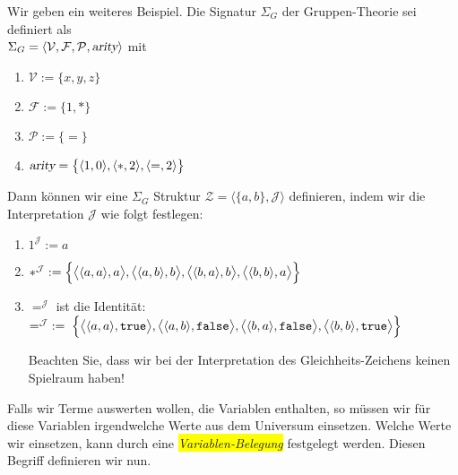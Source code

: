 \example
 Wir geben ein weiteres  Beispiel.
Die Signatur  $\Sigma_G$ der Gruppen-Theorie sei definiert als \\[0.2cm]
\hspace*{1.3cm} $\Sigma_G = \langle \mathcal{V}, \mathcal{F}, \mathcal{P},\textsl{arity}\rangle$ 
\quad mit
\begin{enumerate}
\item $\mathcal{V} := \{ x, y, z \}$
\item $\mathcal{F} := \{ 1, * \}$
\item $\mathcal{P} := \{ \mathtt{=} \}$
\item $\textsl{arity} = \bigl\{ \pair(1,0), \pair(*,2), \pair(\mathtt{=},2)\bigr\}$
\end{enumerate}
Dann k\"{o}nnen wir eine $\Sigma_G$ Struktur $\mathcal{Z} = \langle \{a,
b\},\mathcal{J}\rangle$ definieren, 
indem wir die Interpretation $\mathcal{J}$ 
wie folgt festlegen:
\begin{enumerate}
\item $1^\mathcal{J} := a$ 
\item $*^\mathcal{J} := \Bigl\{ \bigl\langle\pair(a,a), a\bigr\rangle,
                                   \bigl\langle\pair(a,b), b\bigr\rangle,
                                   \bigl\langle\pair(b,a), b\bigr\rangle,
                                   \bigl\langle\pair(b,b), a\bigr\rangle \Bigr\}$
\item $=^\mathcal{J}$ ist die Identit\"{a}t: \\[0.2cm]
       $=^\mathcal{J} \;:=\; \Bigl\{ \bigl\langle\pair(a,a), \mathtt{true}\bigr\rangle,
                                 \bigl\langle\pair(a,b), \mathtt{false}\bigr\rangle,
                                 \bigl\langle\pair(b,a), \mathtt{false}\bigr\rangle,
                                 \bigl\langle\pair(b,b), \mathtt{true}\bigr\rangle \Bigr\}$
                                 
      Beachten Sie, dass wir bei der Interpretation des Gleichheits-Zeichens 
      keinen Spielraum haben! \eox
\end{enumerate}

Falls wir Terme auswerten wollen, die Variablen enthalten, so m\"{u}ssen wir f\"{u}r diese
Variablen irgendwelche Werte aus dem Universum einsetzen.  Welche Werte wir einsetzen, kann
durch eine \colorbox{yellow}{\emph{Variablen-Belegung}} festgelegt werden.  Diesen Begriff definieren wir
nun.

